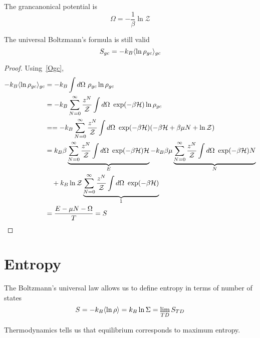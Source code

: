     The grancanonical potential is 
    \begin{equation}\label{Ogc}
        \Omega = - \frac{1}{\beta} \ln \mathcal Z
    \end{equation}

    The universal Boltzmann's formula is still valid
    \begin{equation*}
        S_{gc} = -k_B \langle\ln \rho_{gc}\rangle_{gc} 
    \end{equation*}

    \begin{proof}
        Using~\eqref{Ogc},
        \begin{equation*}
        \begin{aligned}
            -k_B \langle\ln \rho_{gc}\rangle_{gc} & = -k_B \int d\Omega ~ \rho_{gc} \ln \rho_{gc} \\ & = -k_B \sum_{N=0}^{\infty} \frac{z^N}{\mathcal Z} \int d\Omega ~ \exp(- \beta \mathcal H) \ln \rho_{gc} \\ & = = -k_B \sum_{N=0}^{\infty} \frac{z^N}{\mathcal Z} \int d\Omega ~ \exp(- \beta \mathcal H) (- \beta \mathcal H + \beta \mu N + \ln \mathcal Z) \\ & = k_B \beta \underbrace{\sum_{N=0}^{\infty} \frac{z^N}{\mathcal Z} \int d\Omega ~ \exp(-\beta \mathcal H) \mathcal H}_{E} - k_B \beta \mu \underbrace{\sum_{N=0}^{\infty} \frac{z^N}{\mathcal Z} \int d\Omega ~ \exp(-\beta \mathcal H) N}_{N} \\ & \quad + k_B \ln \mathcal Z \underbrace{\sum_{N=0}^{\infty} \frac{z^N}{\mathcal Z} \int d\Omega ~ \exp(-\beta \mathcal H)}_{1} \\ & = \frac{E - \mu N - \Omega}{T} = S
        \end{aligned}
        \end{equation*}
    \end{proof}

\chapter{Entropy}

    The Boltzmann's universal law allows us to define entropy in terms of number of states
    \begin{equation*}
        S = - k_B \langle\ln \rho\rangle = k_B \ln \Sigma = \lim_{TD} S_{TD}
    \end{equation*}

    Thermodynamics tells us that equilibrium corresponds to maximum entropy.

